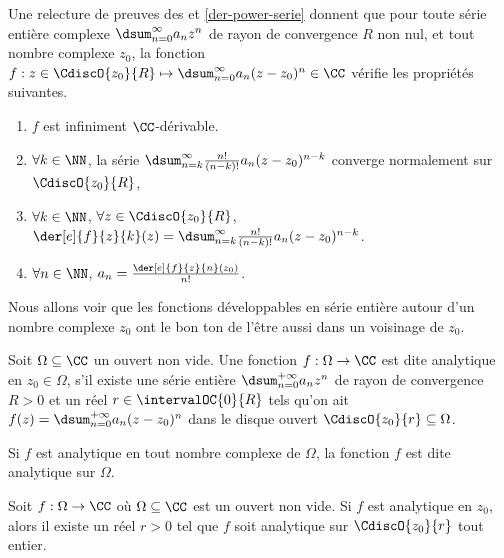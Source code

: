 \begin{remark} \label{der-power-serie-gene}
	Une relecture de preuves des  et \ref{der-power-serie} donnent que pour toute série entière complexe $\dsum_{n=0}^{\infty} a_n z^n$ de rayon de convergence $R$ non nul,
	et tout nombre complexe $z_0$,
	la fonction $f: z \in \CdiscO{z_0}{R} \mapsto \dsum_{n=0}^{\infty} a_n (z - z_0)^n \in \CC$ vérifie les propriétés suivantes.
    \begin{enumerate}
    	\item $f$ est infiniment $\CC$-dérivable.

    	\item $\forall k \in \NN$,
		la série $\dsum_{n = k}^{\infty} \frac{n!}{(n-k)!} a_n (z - z_0)^{n - k}$ converge normalement sur $\CdiscO{z_0}{R}$,

    	\item $\forall k \in \NN$, $\forall z \in \CdiscO{z_0}{R}$,
		$\der[e]{f}{z}{k}(z) = \dsum_{n = k}^{\infty} \frac{n!}{(n-k)!} a_n (z - z_0)^{n - k}$.

    	\item $\forall n \in \NN$, $a_n = \frac{\der[e]{f}{z}{n}(z_0)}{n!}$.
    \end{enumerate}
\end{remark}




Nous allons voir que les fonctions développables en série entière autour d'un nombre complexe $z_0$ ont le bon ton de l'être aussi dans un voisinage de $z_0$.


\begin{defi} \label{def-analytic}
    Soit $\Omega \subseteq \CC$ un ouvert non vide.
	Une fonction $f: \Omega \rightarrow \CC$ est dite analytique en $z_0 \in \Omega$, 
	s'il existe
	une série entière $\dsum_{n = 0}^{+\infty} a_n z^n$
	de rayon de convergence $R > 0$
	et
	un réel $r \in \intervalOC{0}{R}$ tels qu'on ait
	$f(z) = \dsum_{n = 0}^{+\infty} a_n (z - z_0)^n$
	dans le disque ouvert $\CdiscO{z_0}{r} \subseteq \Omega$.

	\smallskip
	
	Si $f$ est analytique en tout nombre complexe de $\Omega$,
	la fonction $f$ est dite analytique sur $\Omega$.
\end{defi}




\begin{fact} \label{power-serie-vs-analytic}
    Soit $f: \Omega \rightarrow \CC$ où $\Omega \subseteq \CC$ est un ouvert non vide.
    Si $f$ est analytique en $z_0$,
	alors
	il existe un réel $r > 0$ tel que $f$ soit analytique sur $\CdiscO{z_0}{r}$ tout entier. 
\end{fact}



